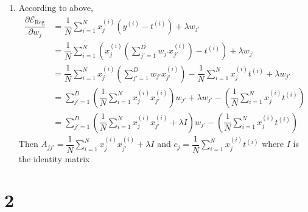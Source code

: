 \documentclass{article}
\begin{document}
\begin{enumerate}
\item %
According to above, 
\begin{align*}
	\dfrac{\partial \mathcal{E}_{\text{Reg}}}{\partial w_{j}} &= \dfrac{1}{N} \sum \limits_{i = 1}^{N}
x_{j}^{(i)} ( y^{(i)} - t^{(i)}) + \lambda w_{j'} \\
	&= \dfrac{1}{N} \sum \limits_{i = 1}^{N} (x_{j}^{(i)} (\sum \limits_{j' = 1}^{D} w_{j'} x_{j'}^{(i)}) - t^{(i)}) + 
\lambda w_{j'} \\
	&= \dfrac{1}{N} \sum \limits_{i = 1}^{N} x_{j}^{(i)} (\sum \limits_{j' = 1}^{D} w_{j'} x_{j'}^{(i)}) - \dfrac{1}{N} \sum \limits_{i = 1}^{N} x_{j}^{(i)} t^{(i)} + \lambda w_{j'} \\
	&= \sum \limits_{j' = 1}^{D} (\dfrac{1}{N} \sum \limits_{i = 1}^{N} x_{j}^{(i)}  x_{j'}^{(i)}) w_{j'}  + \lambda w_{j'} - (\dfrac{1}{N} \sum \limits_{i = 1}^{N} x_{j}^{(i)} t^{(i)}) \\
	&= \sum \limits_{j' = 1}^{D} (\dfrac{1}{N} \sum \limits_{i = 1}^{N} x_{j}^{(i)}  x_{j'}^{(i)} + \lambda I) w_{j'} - (\dfrac{1}{N} \sum \limits_{i = 1}^{N} x_{j}^{(i)} t^{(i)})
\end{align*}
Then $A_{jj'} = \dfrac{1}{N} \sum \limits_{i = 1}^{N} x_{j}^{(i)}  x_{j'}^{(i)} + \lambda I$ and $c_j = \dfrac{1}{N} \sum \limits_{i = 1}^{N} x_{j}^{(i)} t^{(i)}$ where $I$ is the identity matrix

\end{enumerate}


\section*{2}
\end{document}
